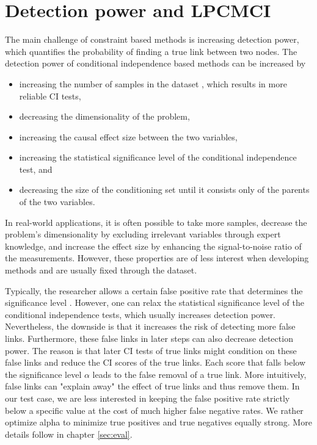\documentclass[conference]{IEEEtran}
\begin{document}
\section{Detection power and LPCMCI}
The main challenge of constraint based methods is increasing detection power, which quantifies the probability of finding a true link between two nodes.
The detection power of conditional independence based methods can be increased by
\begin{itemize}
    \item increasing the number of samples in the dataset \cite{gerhardus_high-recall_2021}, which results in more reliable CI tests,
    \item decreasing the dimensionality of the problem\cite{runge_pcmci_2019},
    \item increasing the causal effect size between the two variables\cite{gerhardus_high-recall_2021},
    \item increasing the statistical significance level of the conditional independence test\cite{gerhardus_high-recall_2021}, and
    \item decreasing the size of the conditioning set until it consists only of the parents of the two variables\cite{runge_pcmci_2019}.
\end{itemize}

In real-world applications, it is often possible to take more samples, decrease the problem's dimensionality by excluding irrelevant variables through expert knowledge, and increase the effect size by enhancing the signal-to-noise ratio of the measurements.
However, these properties are of less interest when developing methods and are usually fixed through the dataset.

Typically, the researcher allows a certain false positive rate that determines the significance level \cite{gerhardus_high-recall_2021}.
However, one can relax the statistical significance level of the conditional independence tests, which usually increases detection power.
Nevertheless, the downside is that it increases the risk of detecting more false links.
Furthermore, these false links in later steps can also decrease detection power. The reason is that later CI tests of true links might condition on these false links and reduce the CI scores of the true links. Each score that falls below the significance level $\alpha$ leads to the false removal of a true link. More intuitively, false links can "explain away" the effect of true links and thus remove them.
In our test case, we are less interested in keeping the false positive rate strictly below a specific value at the cost of much higher false negative rates. We rather optimize alpha to minimize true positives and true negatives equally strong. More details follow in chapter \ref{sec:eval}.
\end{document}
